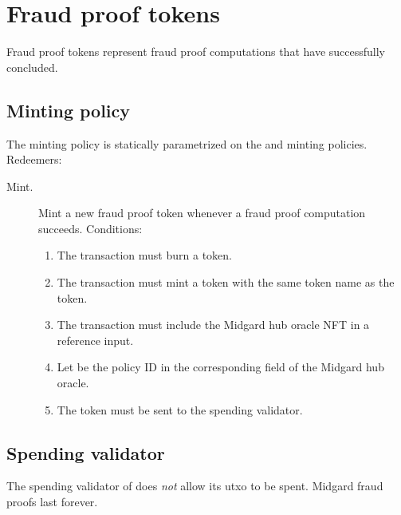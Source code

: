 \documentclass[../midgard.tex]{subfiles}
\begin{document}
\section{Fraud proof tokens}
\label{h:fraud-proof-tokens}

Fraud proof tokens represent fraud proof computations that have successfully concluded.

\subsection{Minting policy}
\label{h:fraud-proof-tokens-minting-policy}

The  minting policy is statically parametrized on the  and  minting policies.
Redeemers:

\begin{description}
    \item[Mint.] Mint a new fraud proof token whenever a fraud proof computation succeeds.
      Conditions:
        \begin{enumerate}
            \item The transaction must burn a  token.
            \item The transaction must mint a  token with the same token name as the  token.
            \item The transaction must include the Midgard hub oracle NFT in a reference input.
            \item Let  be the policy ID in the corresponding field of the Midgard hub oracle.
            \item The  token must be sent to the  spending validator.
        \end{enumerate}
\end{description}

\subsection{Spending validator}
\label{h:fraud-proof-tokens-spending-validator}

The spending validator of  does \emph{not} allow its utxo to be spent.
Midgard fraud proofs last forever.
\end{document}
